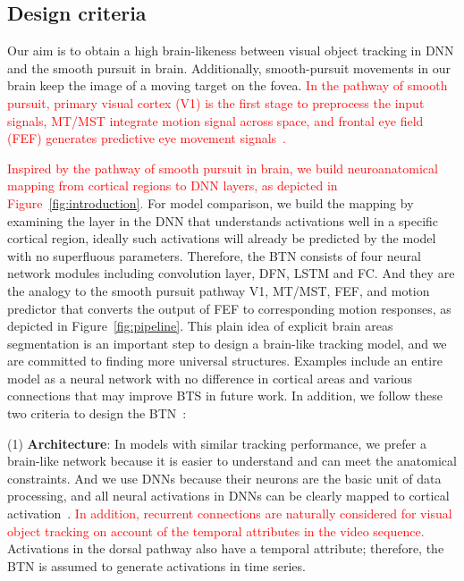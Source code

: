 \documentclass[final,3p,times,twocolumn]{elsarticle}
\begin{document}
\subsection{Design criteria}
Our aim is to obtain a high brain-likeness between visual object tracking in DNN and the smooth pursuit in brain.
Additionally, smooth-pursuit movements in our brain keep the image of a moving target on the fovea. 
\textcolor{red}{
In the pathway of smooth pursuit,
primary visual cortex (V1) is the first stage to preprocess the input signals, 
MT/MST \textcolor{red}{integrate} motion signal across space,
and frontal eye field (FEF) generates predictive eye movement signals~\cite{b11,b13,b14}.
}\par

\textcolor{red}{
Inspired by the pathway of smooth pursuit in brain, we build neuroanatomical mapping from cortical regions to DNN layers, as depicted in Figure~\ref{fig:introduction}.}
For model comparison, we build the mapping by examining the layer in the DNN that understands activations well in a specific cortical region, 
ideally such activations will already be predicted by the model with no superfluous parameters. 
Therefore, the BTN consists of four neural network modules including convolution layer, DFN, LSTM and FC.
And they are the analogy to the smooth pursuit pathway V1, MT/MST, FEF, 
and motion predictor that converts the output of FEF to corresponding motion responses, as depicted in Figure~\ref{fig:pipeline}. 
This plain idea of explicit brain areas segmentation is an important step to design a brain-like tracking model, 
and we are committed to finding more universal structures. 
Examples include an entire model as a neural network with no difference in cortical areas
and various connections that may improve BTS in future work.
In addition, we follow these two criteria to design the BTN~\cite{kubilius2018predict}:

(1) \textbf{Architecture}: In models with similar tracking performance, we prefer a brain-like network because it is easier to understand and can meet the anatomical constraints.
And we use DNNs because their neurons are the basic unit of data processing, 
and all neural activations in DNNs can be clearly mapped to cortical activation~\cite{yamins2016using}.
\textcolor{red}{
In addition, recurrent connections are naturally considered for visual object tracking on account of the temporal attributes in the video sequence.}
Activations in the dorsal pathway also have a temporal attribute; 
therefore, the BTN is assumed to generate activations in time series.
\end{document}
